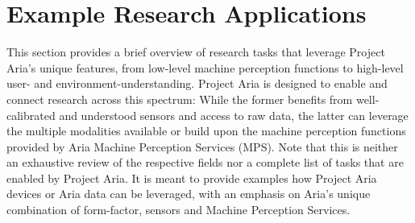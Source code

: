 \section{Example Research Applications}
\label{sec:applications}
This section provides a brief overview of research tasks that leverage Project Aria's unique features, from low-level machine perception functions to high-level user- and environment-understanding. Project Aria is designed to enable and connect research across this spectrum: While the former benefits from well-calibrated and understood sensors and access to raw data, the latter can leverage the multiple modalities available or build upon the machine perception functions provided by Aria Machine Perception Services (MPS). 
Note that this is neither an exhaustive review of the respective fields nor a complete list of tasks that are enabled by Project Aria. It is meant to provide examples how Project Aria devices or Aria data can be leveraged, with an emphasis on Aria's unique combination of form-factor, sensors and Machine Perception Services.

